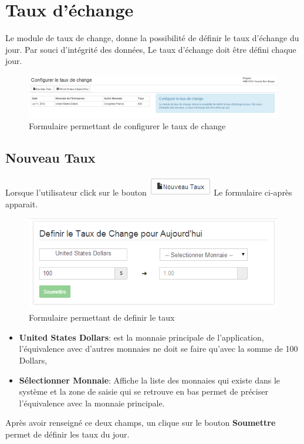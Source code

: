 \documentclass[12pt,a4paper]{report}
\begin{document}
\section{Taux d'échange}
Le module de taux de change, donne la possibilité de définir le taux d'échange du jour. Par souci d'intégrité des données, Le taux d'échange doit être défini chaque jour.


\begin{figure}[h]
\begin{center}
\includegraphics[width=16cm]{pic/FormulaireConfigRate.png}
\end{center}
\caption{Formulaire permettant de configurer le taux de change}
\label{Formulaire permettant de configurer le taux de change}
\end{figure}

\subsection{Nouveau Taux}
Lorsque l'utilisateur click sur le bouton \includegraphics[scale=0.7]{pic/NouveauTaux.png}
 Le formulaire ci-après apparait.

\begin{figure}[h]
\begin{center}
\includegraphics[width=12cm]{pic/DefinirTaux.png}
\end{center}
\caption{Formulaire permettant de definir le taux}
\label{Formulaire permettant de definir le taux}
\end{figure}
\begin{itemize}
\item \textbf{United States Dollars}: est la monnaie principale de l'application, l'équivalence avec d'autres monnaies ne doit se faire qu'avec la somme de 100 Dollars,
\item \textbf{Sélectionner Monnaie}: Affiche la liste des monnaies qui existe dans le système et la zone de saisie qui se retrouve en bas permet de préciser l'équivalence avec la monnaie principale.
\end{itemize}
Après avoir renseigné ce deux champs, un clique sur le bouton \textbf{Soumettre} permet de définir les taux du jour.
\end{document}
